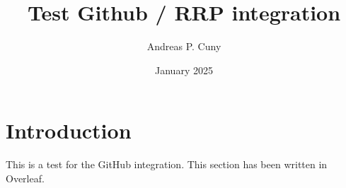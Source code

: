 \documentclass{article}
\title{Test Github / RRP integration}
\author{Andreas P. Cuny}
\date{January 2025}
\begin{document}
\maketitle

\section{Introduction}

This is a test for the GitHub integration.
This section has been written in Overleaf.
\end{document}
